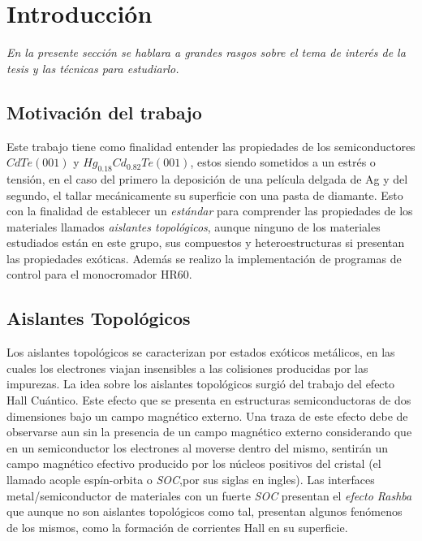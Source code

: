 \chapter{Introducción}
\label{chap:introduction}
\textit{En la presente sección se hablara a grandes rasgos sobre el tema de interés de la tesis
y las técnicas para estudiarlo.}
\vfill
\minitoc
\newpage

\section{Motivación del trabajo}
\label{ch1-why}
Este trabajo tiene como finalidad entender las propiedades de los semiconductores $CdTe(001)$ y 
$ Hg_{0.18}Cd_{0.82}Te (001)$, estos siendo sometidos a un estrés o tensión, en el caso del primero 
la deposición de una película delgada de Ag y del segundo, el tallar mecánicamente su superficie con una 
pasta de diamante. Esto con la finalidad de establecer un \textit{estándar} para comprender las propiedades 
de los materiales llamados \textit{aislantes topológicos}, aunque ninguno de los materiales estudiados están 
en este grupo, sus compuestos y heteroestructuras si presentan las propiedades exóticas. Además se realizo 
la implementación de programas de control para el monocromador HR60.

\section{Aislantes Topológicos}
\label{ch1-ti}
Los aislantes topológicos se caracterizan por estados exóticos metálicos, en las cuales los electrones viajan insensibles 
a las colisiones producidas por las impurezas\cite{Moore2010}\cite{Konig2007}. La idea sobre los aislantes topológicos 
surgió del trabajo del efecto Hall Cuántico. Este efecto que se presenta en estructuras semiconductoras de dos 
dimensiones bajo un campo magnético externo\cite{Klitzing1980}. Una traza de este efecto debe de observarse aun sin la 
presencia de un campo magnético externo considerando que en un semiconductor los electrones al moverse dentro del 
mismo, sentirán un campo magnético efectivo producido por los núcleos positivos del cristal (el llamado acople 
espín-orbita o \textit{SOC},por sus siglas en ingles). Las interfaces metal/semiconductor de materiales con un fuerte 
\textit{SOC} presentan el \textit{efecto Rashba} que aunque no son aislantes topológicos como tal, presentan 
algunos fenómenos de los mismos, como la formación de corrientes Hall en su superficie.\cite{Lin2014}\cite{Bihlmayer2015}

